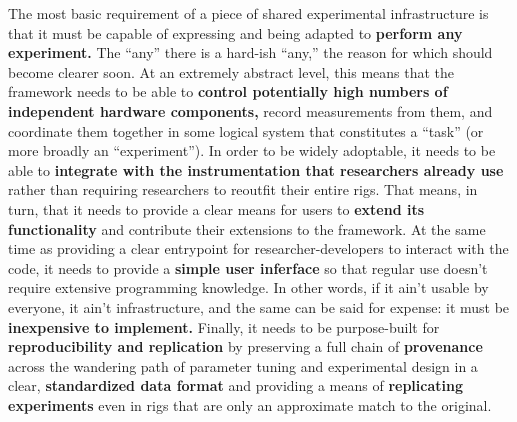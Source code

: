 \documentclass[nohyper]{tufte-book-jls}
\begin{document}
The most basic requirement of a piece of shared experimental
infrastructure is that it must be capable of expressing and being
adapted to \textbf{perform any experiment.} The ``any'' there is a
hard-ish ``any,'' the reason for which should become clearer soon. At an
extremely abstract level, this means that the framework needs to be able
to \textbf{control potentially high numbers of independent hardware
components,} record measurements from them, and coordinate them together
in some logical system that constitutes a ``task'' (or more broadly an
``experiment''). In order to be widely adoptable, it needs to be able to
\textbf{integrate with the instrumentation that researchers already use}
rather than requiring researchers to reoutfit their entire rigs. That
means, in turn, that it needs to provide a clear means for users to
\textbf{extend its functionality} and contribute their extensions to the
framework. At the same time as providing a clear entrypoint for
researcher-developers to interact with the code, it needs to provide a
\textbf{simple user inferface} so that regular use doesn't require
extensive programming knowledge. In other words, if it ain't usable by
everyone, it ain't infrastructure, and the same can be said for expense:
it must be \textbf{inexpensive to implement.} Finally, it needs to be
purpose-built for \textbf{reproducibility and replication} by preserving
a full chain of \textbf{provenance} across the wandering path of
parameter tuning and experimental design in a clear,
\textbf{standardized data format} and providing a means of
\textbf{replicating experiments} even in rigs that are only an
approximate match to the original.
\end{document}
